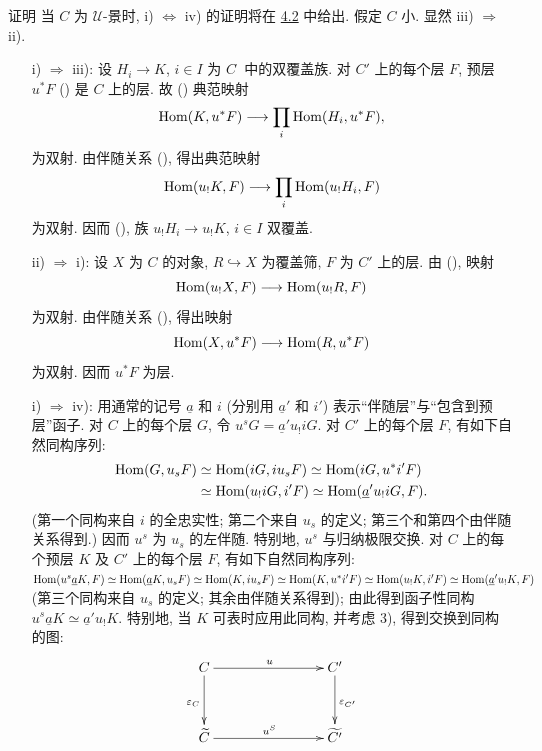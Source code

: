 \begin{enonce*}[remark]{证明}
当 $C$ 为 $𝒰$-景时, i) $\Leftrightarrow$ iv) 的\pageoriginale{}证明将在
\hyperref[III.subsec4.2]{4.2} 中给出. 假定 $C$ 小. 显然 iii) $\Rightarrow$ ii).
\begin{itemize}
\item[i) $\Rightarrow$ iii):] 设 $H_i\rightarrow K$, $i\in I$ 为
$C^{\widehat{\phantom{,}}}$ 中的双覆盖族. 对 $C'$ 上的每个层 $F$,
预层 $u^\ast F$ () 是 $C$ 上的层.
故 () 典范映射
$$
\operatorname{Hom}(K, u^\ast F)\longrightarrow \prod_i \operatorname{Hom}(H_i, u^\ast F){},
$$
为双射. 由伴随关系 (), 得出典范映射
$$
\operatorname{Hom}(u_{!}K,F)\longrightarrow \prod_i \operatorname{Hom}(u_{!}H_i, F)
$$
为双射. 因而 (),
族 $u_{!}H_i\rightarrow u_{!}K$, $i\in I$ 双覆盖.

\item[ii) $\Rightarrow$ i):] 设 $X$ 为 $C$ 的对象,
$R\hookrightarrow X$ 为覆盖筛, $F$ 为 $C'$ 上的层.
由 (), 映射
$$
\operatorname{Hom}(u_{!}X,F)\longrightarrow \operatorname{Hom}(u_{!}R,F)
$$
为双射. 由伴随关系 (), 得出映射
$$
\operatorname{Hom}(X,u^\ast F)\longrightarrow \operatorname{Hom}(R, u^\ast F)
$$
为双射. 因而 $u^\ast F$ 为层.

\item[i) $\Rightarrow$ iv):] 用通常的记号 $\underline{a}$ 和 $i$
(分别用 $\underline{a}'$ 和 $i'$) 表示“伴随层”与“包含到预层”函子.
对 $C$ 上的每个层 $G$, 令 $u^sG=\underline{a}'u_{!}iG$.
对 $C'$ 上的每个层 $F$, 有如下自然同构序列:
\begin{align*}
\operatorname{Hom}(G,u_sF) &\simeq \operatorname{Hom}(iG, iu_s F)\simeq \operatorname{Hom}(iG, u^\ast i'F)\\
             &\simeq \operatorname{Hom}(u_{!}iG, i'F)\simeq \operatorname{Hom}(\underline{a}'u_{!} iG,
             F){}.
\end{align*}
(第一个\pageoriginale{}同构来自 $i$ 的全忠实性; 第二个来自 $u_s$ 的定义;
第三个和第四个由伴随关系得到.) 因而 $u^s$ 为 $u_s$ 的左伴随.
特别地, $u^s$ 与归纳极限交换. 对 $C$ 上的每个预层 $K$ 及 $C'$ 上的每个层 $F$,
有如下自然同构序列:
$\operatorname{Hom}(u^s\underline{a}K,F)\simeq
\operatorname{Hom}(\underline{a}K, u_s F)\simeq \operatorname{Hom}(K,iu_sF)\simeq \operatorname{Hom}(K,u^\ast
i'F)\simeq \operatorname{Hom}(u_{!}K, i'F)\simeq \operatorname{Hom}(\underline{a}'u_{!}K,F)$
(第三个同构来自 $u_s$ 的定义; 其余由伴随关系得到);
由此得到函子性同构 $u^s\underline{a}K\simeq \underline{a}'u_{!}K$.
特别地, 当 $K$ 可表时应用此同构, 并考虑  3),
得到交换到同构的图:
\[
\xymatrix@C=2.75cm@R=1.25cm{
C \ar[d]_{\epsilon_C} \ar[r]^{u}& C'\ar[d]^{\epsilon_{C'}}\\
\widetilde{C} \ar[r]^{u^{S}}& \widetilde{C'} }
\]


\end{itemize}
\end{enonce*}
